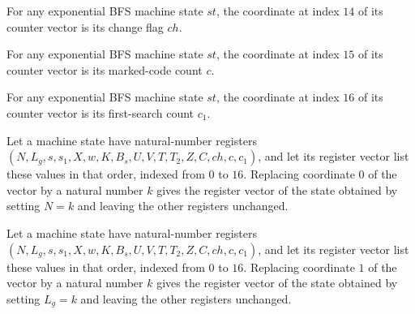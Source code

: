 \begin{lemma}
\label{Complexity.LogProg.ExpBFS.St.toV_ch}
\leanok
{}
For any exponential BFS machine state $st$, the coordinate at index $14$ of its counter
vector is its change flag $ch$.
\end{lemma}

\begin{lemma}
\label{Complexity.LogProg.ExpBFS.St.toV_c}
\leanok
{}
For any exponential BFS machine state $st$, the coordinate at index $15$ of its counter
vector is its marked-code count $c$.
\end{lemma}

\begin{lemma}
\label{Complexity.LogProg.ExpBFS.St.toV_c1}
\leanok
{}
For any exponential BFS machine state $st$, the coordinate at index $16$ of its counter
vector is its first-search count $c_1$.
\end{lemma}

\begin{lemma}
\label{Complexity.LogProg.ExpBFS.St.upd_N}
\leanok
{}
Let a machine state have natural-number registers
$(N,L_g,s,s_1,X,w,K,B_s,U,V,T,T_2,Z,C,ch,c,c_1)$, and let its register vector list these
values in that order, indexed from $0$ to $16$. Replacing coordinate $0$ of the vector
by a natural number $k$ gives the register vector of the state obtained by setting $N=k$
and leaving the other registers unchanged.
\end{lemma}

\begin{lemma}
\label{Complexity.LogProg.ExpBFS.St.upd_Lg}
\leanok
{}
Let a machine state have natural-number registers
$(N,L_g,s,s_1,X,w,K,B_s,U,V,T,T_2,Z,C,ch,c,c_1)$, and let its register vector list these
values in that order, indexed from $0$ to $16$. Replacing coordinate $1$ of the vector
by a natural number $k$ gives the register vector of the state obtained by setting
$L_g=k$ and leaving the other registers unchanged.
\end{lemma}

